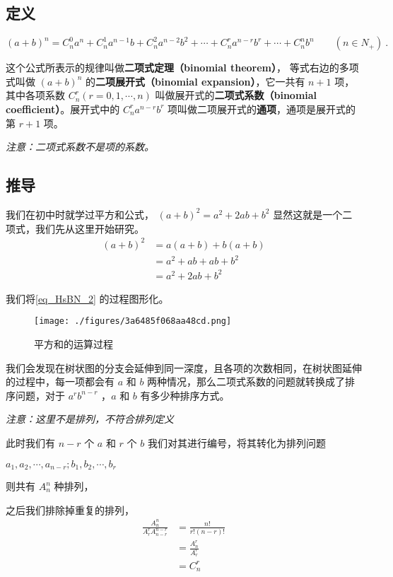 

\subsection{定义}
\begin{equation}
(a + b)^n = C_n^0a^n + C_n^1a^{n- 1}b + C_n^2a^{n- 2}b^2 + \cdots + C_n^ra^{n-r}b^r + \cdots + C_n^nb^n \qquad (n\in N_{+})~.
\end{equation}

这个公式所表示的规律叫做\textbf{二项式定理（binomial theorem）}，
等式右边的多项式叫做 $(a+b)^n$ 的\textbf{二项展开式（binomial expansion）}，它一共有 $n+1$ 项，其中各项系数 $C_n^r(r = 0, 1, \cdots, n)$ 叫做展开式的\textbf{二项式系数（binomial coefficient）}。展开式中的 $C_n^ra^{n-r}b^r$ 项叫做二项展开式的\textbf{通项}，通项是展开式的第 $r+1$ 项。

\textsl{注意：二项式系数不是项的系数。}

\subsection{推导}
我们在初中时就学过平方和公式， $(a+b)^2 = a^2 + 2ab + b^2$ 显然这就是一个二项式，我们先从这里开始研究。
\begin{equation}\label{eq_HsBN_2}
\begin{aligned}
(a+b)^2 &= a(a + b) + b(a + b)\\
&= a^2 + ab + ab + b^2\\
&= a^2 + 2ab + b^2
\end{aligned}
\end{equation}

我们将\autoref{eq_HsBN_2} 的过程图形化。

\begin{figure}[ht]
\centering
\texttt{[image: ./figures/3a6485f068aa48cd.png]}
\caption{平方和的运算过程} \label{fig_HsBN_1}
\end{figure}

我们会发现在树状图的分支会延伸到同一深度，且各项的次数相同，在树状图延伸的过程中，每一项都会有 $a$ 和 $b$ 两种情况，那么二项式系数的问题就转换成了排序问题，对于 $a^rb^{n-r}$ ，$a$ 和 $b$ 有多少种排序方式。

\textsl{注意：这里不是排列，不符合排列定义}

此时我们有 $n-r$ 个 $a$ 和 $r$ 个 $b$ 我们对其进行编号，将其转化为排列问题

$a_1,a_2,\cdots,a_{n-r};b_1,b_2,\cdots,b_r$

 
则共有 $A_n^n$ 种排列，

之后我们排除掉重复的排列，
\begin{equation}
\begin{aligned}
\frac{A_n^n}{A_r^rA_{n-r}^{n-r}} &= \frac{n!}{r!(n-r)!}\\
&= \frac{A_n^r}{A_r^r}\\
&= C_n^r
\end{aligned}
\end{equation}
